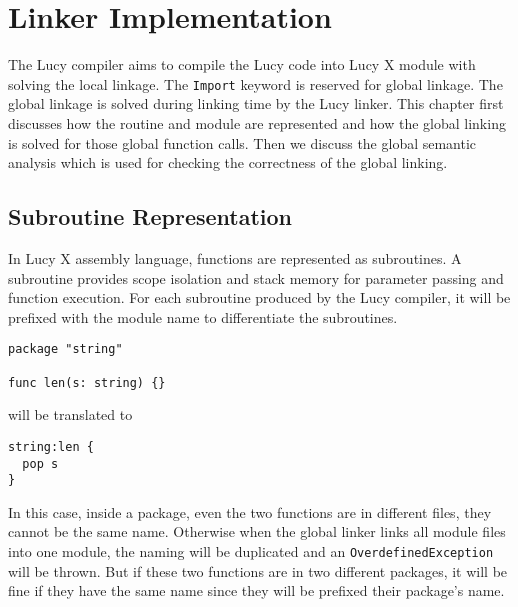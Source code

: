 \chapter{Linker Implementation}
The Lucy compiler aims to compile the Lucy code into Lucy X module with solving the local linkage. The \texttt{Import} keyword is reserved for global linkage. The global linkage is solved during linking time by the Lucy linker. This chapter first discusses how the routine and module are represented and how the global linking is solved for those global function calls. Then we discuss the global semantic analysis which is used for checking the correctness of the global linking.


\section{Subroutine Representation}
In Lucy X assembly language, functions are represented as subroutines. A subroutine provides scope isolation and stack memory for parameter passing and function execution. For each subroutine produced by the Lucy compiler, it will be prefixed with the module name to differentiate the subroutines.
\begin{lstlisting}
package "string"

func len(s: string) {}
\end{lstlisting}
will be translated to
\begin{lstlisting}[language=LucyX]
string:len {
  pop s
}
\end{lstlisting}
In this case, inside a package, even the two functions are in different files, they cannot be the same name. Otherwise when the global linker links all module files into one module, the naming will be duplicated and an \texttt{OverdefinedException} will be thrown. But if these two functions are in two different packages, it will be fine if they have the same name since they will be prefixed their package's name.

